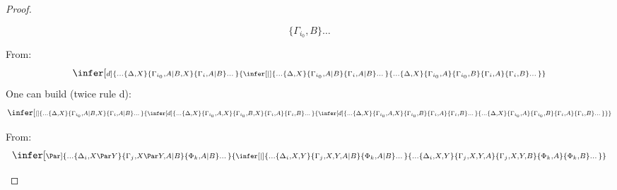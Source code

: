 \documentclass{llncs}
\def\scriptInfer[#1]#2#3{\infer[\scriptstyle #1]{\scriptstyle #2}{\scriptstyle #3}}\def\scriptInferD#1#2{\infer{\scriptstyle #1}{\scriptstyle #2}}
\newcommand{\cpar}{\mid}
\begin{document}
\begin{proof}
\begin{description}
\begin{description}
$${{{                                \{\Gamma_{i_0}, B\} \dots}
			 }
                 }
          $$
     \item[rule $(d)$: ] From:
          $$\scriptInfer[d]{\dots \{\Delta, X\}
                            \{\Gamma_{i_0}, A\cpar B, X\}
                            \{\Gamma_i, A\cpar B\} \dots}
                  {\scriptInfer[\cpar]{\dots \{\Delta, X\}
                                      \{\Gamma_{i_0}, A\cpar B\}
                                      \{\Gamma_i, A\cpar B\} \dots}
                        {\dots \{\Delta, X\}
                               \{\Gamma_{i_0}, A\}
                               \{\Gamma_{i_0}, B\}
                               \{\Gamma_i, A\}
                               \{\Gamma_i, B\} \dots}
                  }
          $$
          One can build (twice rule d):
          $$\scriptInfer[\cpar]{\dots \{\Delta, X\}
                                \{\Gamma_{i_0}, A\cpar B, X\}
                                \{\Gamma_i, A\cpar B\} \dots}
                  {\scriptInfer[d]{\dots \{\Delta, X\}
                                  \{\Gamma_{i_0}, A, X\}
                                  \{\Gamma_{i_0}, B, X\}
                                  \{\Gamma_i, A\}
                                  \{\Gamma_i, B\} \dots}
                        {\scriptInfer[d]{\dots \{\Delta, X\}
                                  \{\Gamma_{i_0}, A, X\}
                                  \{\Gamma_{i_0}, B\}
                                  \{\Gamma_i, A\}
                                  \{\Gamma_i, B\} \dots}
                        {\dots \{\Delta, X\}
                               \{\Gamma_{i_0}, A\}
                               \{\Gamma_{i_0}, B\}
                               \{\Gamma_i, A\}
                               \{\Gamma_i, B\} \dots}
			}
                  }
          $$
     \item[rule $(\Par)$: ] From:
          $$\scriptInfer[\Par]{\dots \{\Delta_i, X\Par Y\} 
                                \{\Gamma_j, X\Par Y, A\cpar B\}
                                \{\Phi_k, A\cpar B\} \dots}
                  {\scriptInfer[\cpar]{\dots \{\Delta_i, X, Y\} 
                                \{\Gamma_j, X, Y, A\cpar B\}
                                \{\Phi_k, A\cpar B\} \dots}
                         {\dots \{\Delta_i, X, Y\} 
                                \{\Gamma_j, X, Y, A\}
                                \{\Gamma_j, X, Y, B\} 
                                \{\Phi_k, A\} 
                                \{\Phi_k, B\} \dots}
                  }
          $$    

\end{description}
\end{description}
\end{proof}
\end{document}

